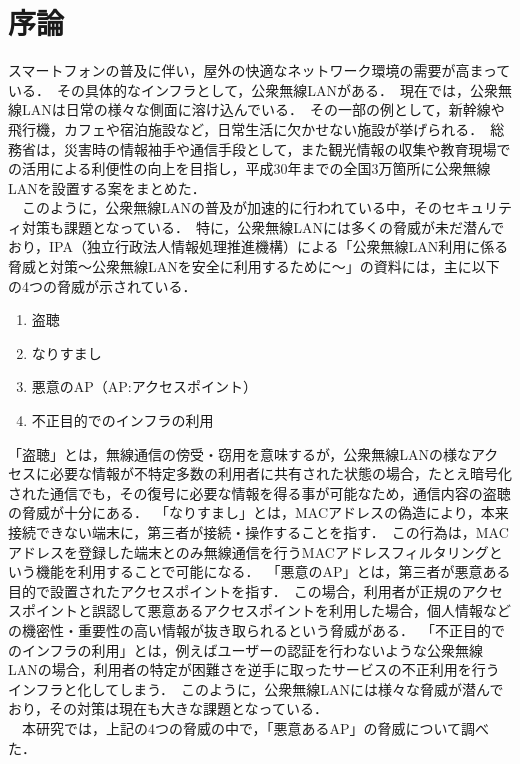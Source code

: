 \documentclass[dvipdfmx]{jsarticle}
\begin{document}
    \section{序論}
        スマートフォンの普及に伴い，屋外の快適なネットワーク環境の需要が高まっている．\
        その具体的なインフラとして，公衆無線LANがある．\
        現在では，公衆無線LANは日常の様々な側面に溶け込んでいる．\
        その一部の例として，新幹線や飛行機，カフェや宿泊施設など，日常生活に欠かせない施設が挙げられる．\
        総務省は，災害時の情報袖手や通信手段として，また観光情報の収集や教育現場での活用による利便性の向上を目指し，平成30年までの全国3万箇所に公衆無線LANを設置する案をまとめた\cite{SoumuWiFi}．\\
        　このように，公衆無線LANの普及が加速的に行われている中，そのセキュリティ対策も課題となっている．\
        特に，公衆無線LANには多くの脅威が未だ潜んでおり，IPA（独立行政法人情報処理推進機構）による「公衆無線LAN利用に係る脅威と対策～公衆無線LANを安全に利用するために～」の資料\cite{IPA}には，主に以下の4つの脅威が示されている．\
        \begin{enumerate}
            \item 盗聴
            \item なりすまし
            \item 悪意のAP（AP:アクセスポイント）
            \item 不正目的でのインフラの利用
        \end{enumerate}
        「盗聴」とは，無線通信の傍受・窃用を意味するが，公衆無線LANの様なアクセスに必要な情報が不特定多数の利用者に共有された状態の場合，たとえ暗号化された通信でも，その復号に必要な情報を得る事が可能なため，通信内容の盗聴の脅威が十分にある．\
        「なりすまし」とは，MACアドレスの偽造により，本来接続できない端末に，第三者が接続・操作することを指す．\
        この行為は，MACアドレスを登録した端末とのみ無線通信を行うMACアドレスフィルタリングという機能を利用することで可能になる．\
        「悪意のAP」とは，第三者が悪意ある目的で設置されたアクセスポイントを指す．\
        この場合，利用者が正規のアクセスポイントと誤認して悪意あるアクセスポイントを利用した場合，個人情報などの機密性・重要性の高い情報が抜き取られるという脅威がある．\
        「不正目的でのインフラの利用」とは，例えばユーザーの認証を行わないような公衆無線LANの場合，利用者の特定が困難さを逆手に取ったサービスの不正利用を行うインフラと化してしまう．\
        このように，公衆無線LANには様々な脅威が潜んでおり，その対策は現在も大きな課題となっている．\\
        　本研究では，上記の4つの脅威の中で，「悪意あるAP」の脅威について調べた．\
\end{document}
